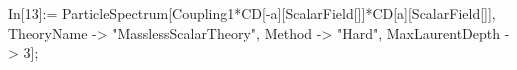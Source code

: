 In[13]:= ParticleSpectrum[Coupling1*CD[-a][ScalarField[]]*CD[a][ScalarField[]], TheoryName -> "MasslessScalarTheory", Method -> "Hard", MaxLaurentDepth -> 3]; 